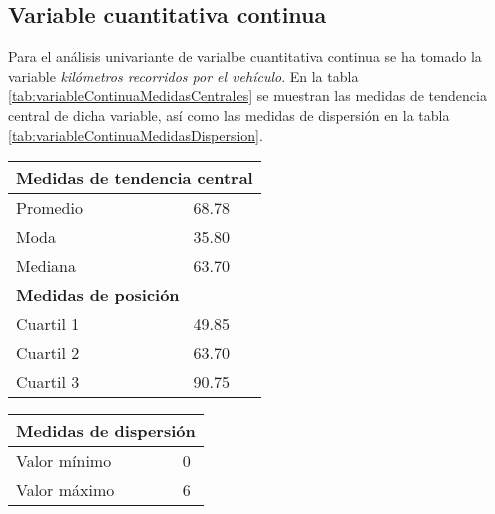 \subsection*{Variable cuantitativa continua}
Para el análisis univariante de varialbe cuantitativa continua se ha tomado la variable \emph{kilómetros recorridos por el vehículo}. En la tabla \ref{tab:variableContinuaMedidasCentrales} se muestran las medidas de tendencia central de dicha variable, así como las medidas de dispersión en la tabla \ref{tab:variableContinuaMedidasDispersion}.\par
\vspace{2em}
\begin{footnotesize}
    \begin{minipage}[ht]{0.4\textwidth}
        \centering
        \begin{tabular}{lc}
            \toprule
            \multicolumn{2}{l}{\textbf{Medidas de tendencia central}} \\
            \bottomrule
            Promedio & 68.78\\
            \midrule
            Moda & 35.80\\
            \midrule
            Mediana & 63.70\\
            \bottomrule
            \toprule
            \multicolumn{2}{l}{\textbf{Medidas de posición}} \\
            \bottomrule
            Cuartil 1 & 49.85 \\
            \midrule
            Cuartil 2 & 63.70 \\
            \midrule
            Cuartil 3 & 90.75 \\
            \bottomrule
        \end{tabular}
        \label{tab:variableContinuaMedidasCentrales}
    \end{minipage}
    \begin{minipage}[ht]{0.4\textwidth}
        \centering
        \begin{tabular}{lc}
            \toprule
            \multicolumn{2}{l}{\textbf{Medidas de dispersión}} \\
            \bottomrule
            \toprule
            Valor mínimo & 0 \\
            \midrule
            Valor máximo & 6 \\

\end{tabular}
\end{minipage}
\end{footnotesize}
